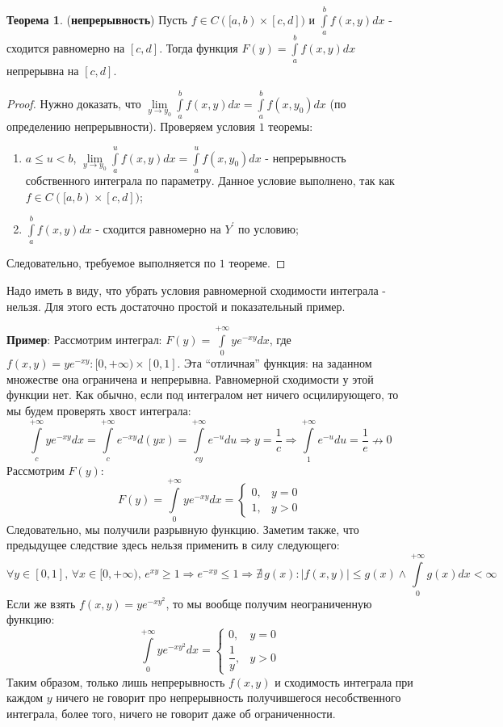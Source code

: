 \documentclass[12pt]{article}
\theoremstyle{definition}
\newtheorem{theorem}{Теорема}
\newcommand{\ddint}[2]{\displaystyle\int\limits_{#1}^{#2}}
\begin{document}
\begin{theorem}(\textbf{непрерывность})
	Пусть $f \in C([a,b)\times [c,d])$ и $\ddint{a}{b}f(x,y)dx$ - сходится равномерно на $[c,d]$. Тогда функция $F(y) = \ddint{a}{b}f(x,y)dx$ непрерывна на $[c,d]$.
\end{theorem}
\begin{proof}
	Нужно доказать, что $\lim\limits_{y \to y_0}\ddint{a}{b}f(x,y)dx = \ddint{a}{b}f(x,y_0)dx$ (по определению непрерывности). Проверяем условия $1$ теоремы:
	\begin{enumerate}[label=(\Roman*)]
		\item $a \leq u < b$, $\lim\limits_{y \to y_0}\ddint{a}{u}f(x,y)dx = \ddint{a}{u}f(x,y_0)dx$ - непрерывность собственного интеграла по параметру. Данное условие выполнено, так как $f \in C([a,b)\times [c,d])$;
		\item $\ddint{a}{b}f(x,y)dx$ - сходится равномерно на $Y^\prime$ по условию;
	\end{enumerate}
	Следовательно, требуемое выполняется по $1$ теореме.
\end{proof}

Надо иметь в виду, что убрать условия равномерной сходимости интеграла - нельзя. Для этого есть достаточно простой и показательный пример.

\textbf{Пример}: Рассмотрим интеграл: $F(y) =\ddint{0}{+\infty}ye^{-xy}dx$, где $f(x,y) = ye^{-xy} \colon [0,+\infty) \times [0,1]$. Эта ``отличная'' функция: на заданном множестве она ограничена и непрерывна. Равномерной сходимости у этой функции нет. Как обычно, если под интегралом нет ничего осцилирующего, то мы будем проверять хвост интеграла:
$$
	\ddint{c}{+\infty}ye^{-xy}dx = \ddint{c}{+\infty}e^{-xy}d(yx) = \ddint{cy}{+\infty}e^{-u}du \Rightarrow y = \dfrac{1}{c} \Rightarrow \ddint{1}{+\infty}e^{-u}du = \dfrac{1}{e} \nrightarrow 0
$$
Рассмотрим $F(y)$:
$$
	F(y) = \ddint{0}{+\infty}ye^{-xy}dx = 
	\left\{
		\begin{array}{ll}
			0, & y = 0 \\[4pt]
			1, & y > 0
		\end{array}
	\right.
$$
Следовательно, мы получили разрывную функцию. Заметим также, что предыдущее следствие здесь нельзя применить в силу следующего:
$$
	\forall y \in [0,1],\, \forall x \in [0,+\infty), \, e^{xy} \geq 1 \Rightarrow e^{-xy} \leq 1 \Rightarrow \nexists \, g(x) \colon |f(x,y)| \leq g(x) \wedge \ddint{0}{+\infty}g(x)dx < \infty
$$
Если же взять $f(x,y) = ye^{-xy^2}$, то мы вообще получим неограниченную функцию:
$$
	\ddint{0}{+\infty}ye^{-xy^2}dx = 
	\left\{
		\begin{array}{ll}
			0, & y = 0 \\[4pt]
			\dfrac{1}{y}, & y > 0
		\end{array}
	\right.
$$
Таким образом, только лишь непрерывность $f(x,y)$ и сходимость интеграла при каждом $y$ ничего не говорит про непрерывность получившегося несобственного интеграла, более того, ничего не говорит даже об ограниченности.
\end{document}
